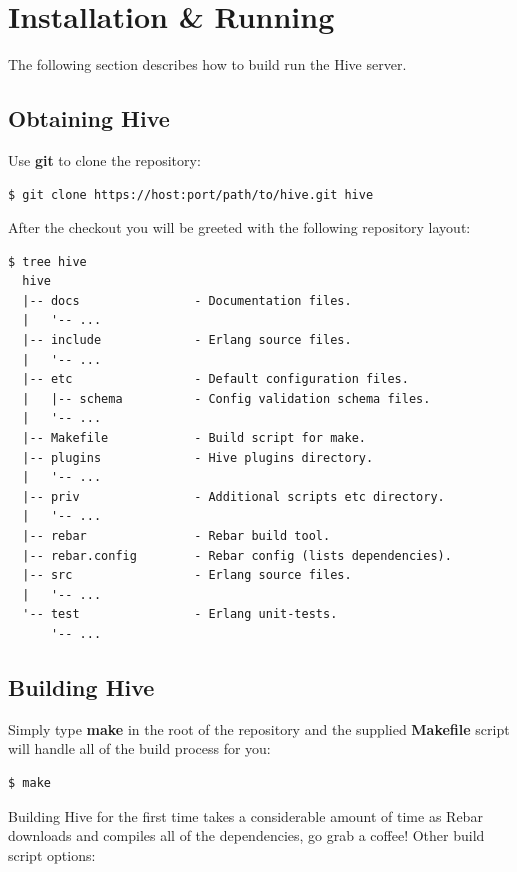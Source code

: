 \documentclass[a4paper]{article}
\begin{document}
\pagebreak
\section{Installation \& Running}
\label{sec-2}

The following section describes how to build run the Hive server.
\subsection{Obtaining Hive}
\label{sec-2-1}

Use \textbf{git} to clone the repository:


\begin{verbatim}
$ git clone https://host:port/path/to/hive.git hive
\end{verbatim}



\noindent
After the checkout you will be greeted with the following repository layout:


\begin{verbatim}
$ tree hive
  hive
  |-- docs                - Documentation files.
  |   '-- ...
  |-- include             - Erlang source files.
  |   '-- ...
  |-- etc                 - Default configuration files.
  |   |-- schema          - Config validation schema files.
  |   '-- ...
  |-- Makefile            - Build script for make.
  |-- plugins             - Hive plugins directory.
  |   '-- ...
  |-- priv                - Additional scripts etc directory.
  |   '-- ...
  |-- rebar               - Rebar build tool.
  |-- rebar.config        - Rebar config (lists dependencies).
  |-- src                 - Erlang source files.
  |   '-- ...
  '-- test                - Erlang unit-tests.
      '-- ...
\end{verbatim}
\subsection{Building Hive}
\label{sec-2-2}

Simply type \textbf{make} in the root of the repository and the supplied \textbf{Makefile} script will handle all of the build process for you:


\begin{verbatim}
$ make
\end{verbatim}



\noindent
Building Hive for the first time takes a considerable amount of time as Rebar downloads and compiles all of the dependencies, go grab a coffee! Other build script options:
\end{document}

